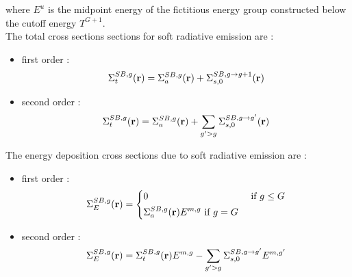 where $E^u$ is the midpoint energy of the fictitious energy group constructed
below the cutoff energy $T^{G+1}$.\\
The total cross sections sections for soft radiative emission are :
\begin{itemize}
\item first order :
\begin{equation}
\Sigma_{t}^{SB,g}(\mathbf{r}) = \Sigma_{a}^{SB,g}(\mathbf{r}) + \Sigma_{s,0}^{SB,g\rightarrow
g+1}(\mathbf{r})
\end{equation}
\item second order :
\begin{equation}
\Sigma_t^{SB,g}(\mathbf{r}) = \Sigma_{a}^{SB,g}(\mathbf{r}) + \sum_{g' >
g}\Sigma_{s,0}^{SB,g\rightarrow g'}(\mathbf{r})
\end{equation}
\end{itemize}

The energy deposition cross sections due to soft radiative emission are :
\begin{itemize}
\item first order :
\begin{equation}
\Sigma_E^{SB,g}(\mathbf{r}) = 
\left\{
\begin{aligned}
& 0 & \textrm{ if } g\leq G\\
& \Sigma_a^{SB,g}(\mathbf{r}) E^{m,g} \textrm{ if } g=G
\end{aligned}
\right.
\end{equation}
\item second order :
\begin{equation}
\Sigma_E^{SB,g}(\mathbf{r}) = \Sigma_{t}^{SB,g}(\mathbf{r}) E^{m,g} - \sum_{g'>g}
\Sigma_{s,0}^{SB,g\rightarrow g'} E^{m,g'}
\end{equation}
\end{itemize}


